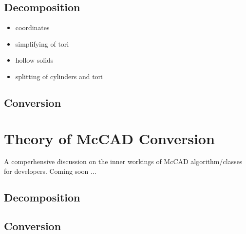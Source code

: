 \documentclass[letterpaper, 12 pt]{report}
\begin{document}
\subsection{Decomposition}
\begin{itemize}
	\item coordinates
	\item simplifying of tori
	\item hollow solids
	\item splitting of cylinders and tori
\end{itemize}
\subsection{Conversion}


\section{Theory of McCAD Conversion} \label{Theory of McCAD Conversion}
A comperhensive discussion on the inner workings of McCAD algorithm/classes for developers. Coming soon ...
\subsection{Decomposition}
\subsection{Conversion}
\newpage
%

\end{document}
